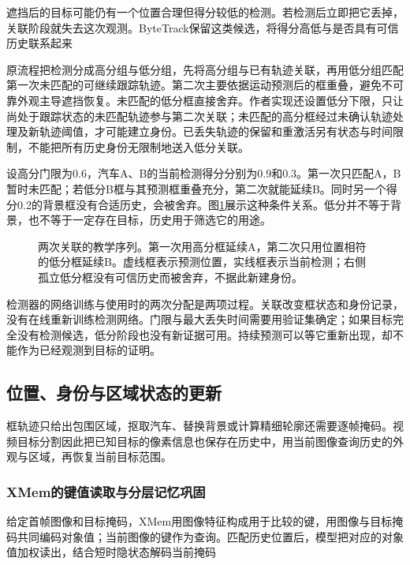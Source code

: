 遮挡后的目标可能仍有一个位置合理但得分较低的检测。若检测后立即把它丢掉，关联阶段就失去这次观测。ByteTrack保留这类候选，将得分高低与是否具有可信历史联系起来

原流程把检测分成高分组与低分组，先将高分组与已有轨迹关联，再用低分组匹配第一次未匹配的可继续跟踪轨迹。第二次主要依据运动预测后的框重叠，避免不可靠外观主导遮挡恢复。未匹配的低分框直接舍弃。作者实现还设置低分下限，只让尚处于跟踪状态的未匹配轨迹参与第二次关联；未匹配的高分框经过未确认轨迹处理及新轨迹阈值，才可能建立身份。已丢失轨迹的保留和重激活另有状态与时间限制，不能把所有历史身份无限制地送入低分关联。

设高分门限为0.6，汽车A、B的当前检测得分分别为0.9和0.3。第一次只匹配A，B暂时未匹配；若低分B框与其预测框重叠充分，第二次就能延续B。同时另一个得分0.2的背景框没有合适历史，会被舍弃。图\ref{fig:vision-bytetrack-association}展示这种条件关系。低分并不等于背景，也不等于一定存在目标，历史用于筛选它的用途。

\begin{figure}[htbp]
  \centering
  
  \caption{两次关联的教学序列。第一次用高分框延续A，第二次只用位置相符的低分框延续B。虚线框表示预测位置，实线框表示当前检测；右侧孤立低分框没有可信历史而被舍弃，不据此新建身份。}
  \label{fig:vision-bytetrack-association}
\end{figure}

检测器的网络训练与使用时的两次分配是两项过程。关联改变框状态和身份记录，没有在线重新训练检测网络。门限与最大丢失时间需要用验证集确定；如果目标完全没有检测候选，低分阶段也没有新证据可用。持续预测可以等它重新出现，却不能作为已经观测到目标的证明。

\subsection{位置、身份与区域状态的更新}
\label{sec:vision-video-state-update}

框轨迹只给出包围区域，抠取汽车、替换背景或计算精细轮廓还需要逐帧掩码。视频目标分割因此把已知目标的像素信息也保存在历史中，用当前图像查询历史的外观与区域，再恢复当前目标范围。

\subsubsection{XMem的键值读取与分层记忆巩固}
\label{sec:vision-video-xmem}

给定首帧图像和目标掩码，XMem用图像特征构成用于比较的键，用图像与目标掩码共同编码对象值；当前图像的键作为查询。匹配历史位置后，模型把对应的对象值加权读出，结合短时隐状态解码当前掩码

